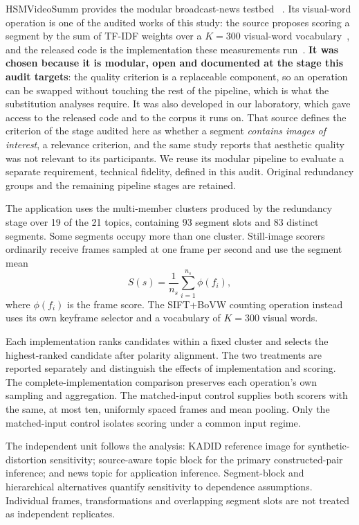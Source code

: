 HSMVideoSumm provides the modular broadcast-news testbed ~\citep{barbieri2021tese,barbieri2021content,moraes2024hsmvideosumm}. Its visual-word operation is one of the audited works of this study: the source proposes scoring a segment by the sum of TF-IDF weights over a $K=300$ visual-word vocabulary~\citep{barbieri2021tese}, and the released code is the implementation these measurements run~\citep{moraes2024hsmvideosumm}. \textbf{It was chosen because it is modular, open and documented at the stage this audit targets}: the quality criterion is a replaceable component, so an operation can be swapped without touching the rest of the pipeline, which is what the substitution analyses require. It was also developed in our laboratory, which gave access to the released code and to the corpus it runs on. That source defines the criterion of the stage audited here as whether a segment \emph{contains images of interest}, a relevance criterion, and the same study reports that aesthetic quality was not relevant to its participants. We reuse its modular pipeline to evaluate a separate requirement, technical fidelity, defined in this audit. Original redundancy groups and the remaining pipeline stages are retained.

The application uses the \disClusters{} multi-member clusters produced by the redundancy stage over 19 of the 21 topics, containing 93 segment slots and 83 distinct segments. Some segments occupy more than one cluster. Still-image scorers ordinarily receive frames sampled at one frame per second and use the segment mean
\begin{equation}
S(s)=\frac{1}{n_s}\sum_{i=1}^{n_s}\phi(f_i),
\label{eq:meanpool}
\end{equation}
where $\phi(f_i)$ is the frame score. The SIFT+BoVW counting operation instead uses its own keyframe selector and a vocabulary of $K=300$ visual words.

Each implementation ranks candidates within a fixed cluster and selects the highest-ranked candidate after polarity alignment. The two treatments are reported separately and distinguish the effects of implementation and scoring. The complete-implementation comparison preserves each operation's own sampling and aggregation. The matched-input control supplies both scorers with the same, at most ten, uniformly spaced frames and mean pooling. Only the matched-input control isolates scoring under a common input regime.

The independent unit follows the analysis: KADID reference image for synthetic-distortion sensitivity; source-aware topic block for the primary constructed-pair inference; and news topic for application inference. Segment-block and hierarchical alternatives quantify sensitivity to dependence assumptions. Individual frames, transformations and overlapping segment slots are not treated as independent replicates.


